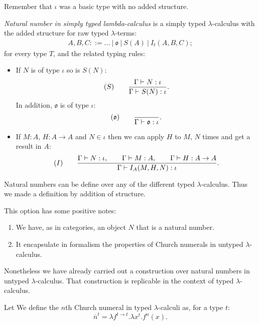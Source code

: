 \begin{remark}
  Remember that $\iota$ was a basic type with no added structure.
\end{remark}
\begin{definition}
  \emph{Natural number in simply typed lambda-calculus} is a simply typed $\lambda$-calculus with the added structure for raw typed $\lambda$-terms:
  \begin{align*}
    A,B, C ::= ...\ |\ \mathfrak{o}\ |\ S(A)\ |\ I_t(A,B,C);
  \end{align*}
  for every type $T$, and the related typing rules:
  \begin{itemize}
  \item If $N$ is of type $\iota$ so is $S(N)$:
    $$  (S)\qquad  {\displaystyle\Gamma \vdash N:\iota \over \Gamma \vdash S(N):\iota}.$$
    In addition, $\mathfrak{o}$ is of type $\iota$:
    $$  (\mathfrak{o})\qquad  {\displaystyle\over \Gamma \vdash \mathfrak{o}:\iota}.$$
  \item If $M: A$, $H: A\to A$ and $N\in \iota$ then we can apply $H$ to $M$, $N$ times and get a result in $A$:
    $$  (I)\qquad  {\displaystyle\Gamma \vdash N:\iota, \qquad \Gamma \vdash M:A,\qquad \Gamma \vdash H:A\to A \over \Gamma \vdash I_A(M,H,N):\iota}.$$
  \end{itemize}
\end{definition}

\begin{remark} \label{remark-natural-numbers}
  Natural numbers can be define over any of the different typed $\lambda$-calculus. Thus we made a definition by addition of structure. 
\end{remark}

This option has some positive notes:
\begin{enumerate}
\item We have, as in categories, an object $N$ that is a natural number.
\item It encapsulate in formalism the properties of Church numerals in untyped $\lambda$-calculus.
\end{enumerate}

Nonetheless we have already carried out a construction over natural numbers in untyped $\lambda$-calculus. That construction is replicable in the context of typed $\lambda$-calculus.

\begin{definition}
  Let We define the $n$th Church numeral in typed $\lambda$-calculi as, for a type $t$:
  $$\overline n^t = \lambda f^{t \to t}. \lambda x^{t}. f^{n}(x).$$
  
\end{definition}

